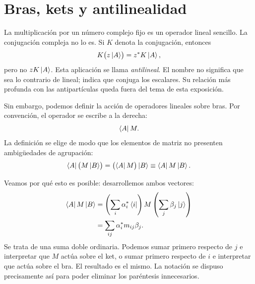 \section{Bras, kets y antilinealidad}

\begin{classroomqa}
\end{classroomqa}

La multiplicación por un número complejo fijo es un operador lineal sencillo. La conjugación compleja no lo es. Si \(K\) denota la conjugación, entonces
\[
K\bigl(z\left\lvert A\right\rangle\bigr)=z^*K\left\lvert A\right\rangle,
\]
pero no \(zK\left\lvert A\right\rangle\). Esta aplicación se llama \emph{antilineal}. El nombre no significa que sea lo contrario de lineal; indica que conjuga los escalares. Su relación más profunda con las antipartículas queda fuera del tema de esta exposición.

Sin embargo, podemos definir la acción de operadores lineales sobre bras. Por convención, el operador se escribe a la derecha:
\begin{equation}
\left\langle A\right\rvert M.
\end{equation}
La definición se elige de modo que los elementos de matriz no presenten ambigüedades de agrupación:
\begin{equation}
\left\langle A\right\rvert\bigl(M\left\lvert B\right\rangle\bigr)
=
\bigl(\left\langle A\right\rvert M\bigr)\left\lvert B\right\rangle
\equiv
\left\langle A\right\rvert M\left\lvert B\right\rangle.
\label{eq:bracket-independence}
\end{equation}

Veamos por qué esto es posible: desarrollemos ambos vectores:
\begin{align}
\left\langle A\right\rvert M\left\lvert B\right\rangle
 &=\left(\sum_i\alpha_i^*\left\langle i\right\rvert\right)
   M
   \left(\sum_j\beta_j\left\lvert j\right\rangle\right)\\
 &=\sum_{ij}\alpha_i^*m_{ij}\beta_j.
\label{eq:matrix-element-double-sum}
\end{align}
Se trata de una suma doble ordinaria. Podemos sumar primero respecto de \(j\) e interpretar que \(M\) actúa sobre el ket, o sumar primero respecto de \(i\) e interpretar que actúa sobre el bra. El resultado es el mismo. La notación se dispuso precisamente así para poder eliminar los paréntesis innecesarios.

